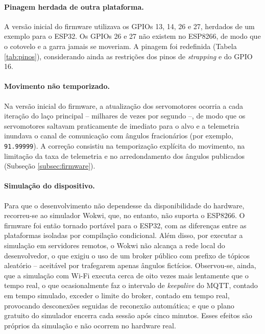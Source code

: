 \documentclass[12pt]{article}
\begin{document}
\paragraph{Pinagem herdada de outra plataforma.} A versão inicial do firmware utilizava os GPIOs 13, 14, 26 e 27, herdados de um exemplo para o ESP32. Os GPIOs 26 e 27 não existem no ESP8266, de modo que o cotovelo e a garra jamais se moveriam. A pinagem foi redefinida (Tabela \ref{tab:pinos}), considerando ainda as restrições dos pinos de \textit{strapping} e do GPIO 16.

\paragraph{Movimento não temporizado.} Na versão inicial do firmware, a atualização dos servomotores ocorria a cada iteração do laço principal -- milhares de vezes por segundo --, de modo que os servomotores saltavam praticamente de imediato para o alvo e a telemetria inundava o canal de comunicação com ângulos fracionários (por exemplo, \texttt{91.99999}). A correção consistiu na temporização explícita do movimento, na limitação da taxa de telemetria e no arredondamento dos ângulos publicados (Subseção \ref{subsec:firmware}).

\paragraph{Simulação do dispositivo.} Para que o desenvolvimento não dependesse da disponibilidade do hardware, recorreu-se ao simulador Wokwi, que, no entanto, não suporta o ESP8266. O firmware foi então tornado portável para o ESP32, com as diferenças entre as plataformas isoladas por compilação condicional. Além disso, por executar a simulação em servidores remotos, o Wokwi não alcança a rede local do desenvolvedor, o que exigiu o uso de um broker público com prefixo de tópicos aleatório -- aceitável por trafegarem apenas ângulos fictícios. Observou-se, ainda, que a simulação com Wi-Fi executa cerca de oito vezes mais lentamente que o tempo real, o que ocasionalmente faz o intervalo de \textit{keepalive} do MQTT, contado em tempo simulado, exceder o limite do broker, contado em tempo real, provocando desconexões seguidas de reconexão automática; e que o plano gratuito do simulador encerra cada sessão após cinco minutos. Esses efeitos são próprios da simulação e não ocorrem no hardware real.
\end{document}
